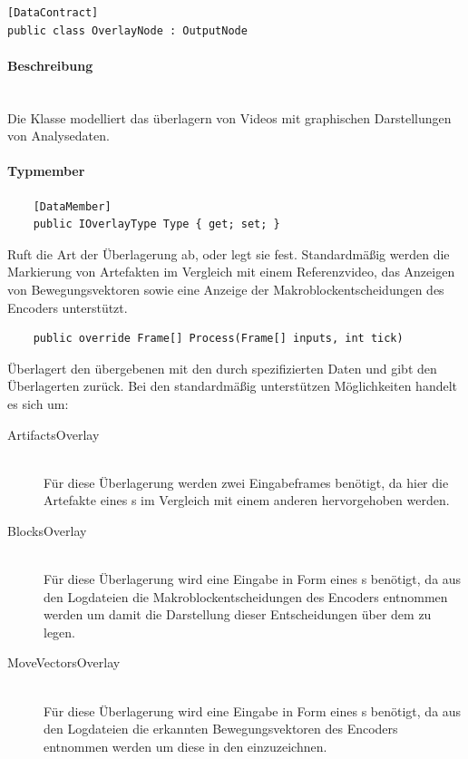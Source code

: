 \begin{verbatim}
[DataContract]
public class OverlayNode : OutputNode
\end{verbatim}

\paragraph{Beschreibung}~\\
Die Klasse  modelliert das überlagern von Videos mit graphischen Darstellungen von Analysedaten.

\paragraph{Typmember}
\begin{itemize}

	\begin{verbatim}
	[DataMember]
	public IOverlayType Type { get; set; }
	\end{verbatim}
	Ruft die Art der Überlagerung ab, oder legt sie fest. Standardmäßig werden die Markierung von Artefakten im Vergleich mit einem Referenzvideo, das Anzeigen von Bewegungsvektoren sowie eine Anzeige der Makroblockentscheidungen des Encoders unterstützt.

	\begin{verbatim}
	public override Frame[] Process(Frame[] inputs, int tick)
	\end{verbatim}
	Überlagert den übergebenen  mit den durch  spezifizierten Daten und gibt den Überlagerten  zurück. Bei den standardmäßig unterstützen Möglichkeiten handelt es sich um:
	\begin{description}
		\item[ArtifactsOverlay]~\\
			Für diese Überlagerung werden zwei Eingabeframes benötigt, da hier die Artefakte eines s im Vergleich mit einem anderen hervorgehoben werden.
		\item[BlocksOverlay]~\\
			Für diese Überlagerung wird eine Eingabe in Form eines s benötigt, da aus den Logdateien die Makroblockentscheidungen des Encoders entnommen werden um damit die Darstellung dieser Entscheidungen über dem  zu legen.
		\item[MoveVectorsOverlay]~\\
			Für diese Überlagerung wird eine Eingabe in Form eines s benötigt, da aus den Logdateien die erkannten Bewegungsvektoren des Encoders entnommen werden um diese in den  einzuzeichnen.
	\end{description}
	
\end{itemize}

